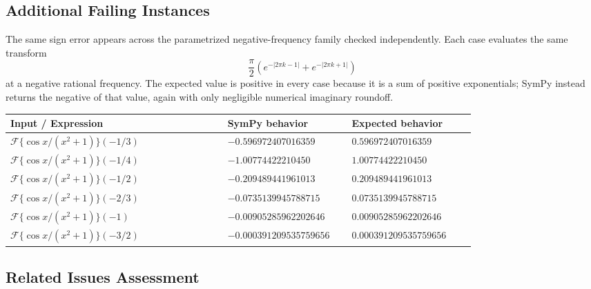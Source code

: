 \documentclass[11pt]{article}
\begin{document}
\subsection{Additional Failing Instances}

The same sign error appears across the parametrized negative-frequency family
checked independently. Each case evaluates the same transform
\[
    \frac{\pi}{2}\left(e^{-|2\pi k-1|}+e^{-|2\pi k+1|}\right)
\]
at a negative rational frequency. The expected value is positive in every case
because it is a sum of positive exponentials; SymPy instead returns the negative
of that value, again with only negligible numerical imaginary roundoff.

\begin{center}
\small
\renewcommand{\arraystretch}{1.3}
\begin{tabular}{@{}>{\raggedright\arraybackslash}p{0.42\linewidth}>{\raggedright\arraybackslash}p{0.24\linewidth}>{\raggedright\arraybackslash}p{0.24\linewidth}@{}}
\toprule
\textbf{Input / Expression} & \textbf{SymPy behavior} & \textbf{Expected behavior} \\
\midrule
\(\mathcal{F}\{\cos x/(x^2+1)\}(-1/3)\) & \(-0.596972407016359\) & \(0.596972407016359\) \\
\(\mathcal{F}\{\cos x/(x^2+1)\}(-1/4)\) & \(-1.00774422210450\) & \(1.00774422210450\) \\
\(\mathcal{F}\{\cos x/(x^2+1)\}(-1/2)\) & \(-0.209489441961013\) & \(0.209489441961013\) \\
\(\mathcal{F}\{\cos x/(x^2+1)\}(-2/3)\) & \(-0.0735139945788715\) & \(0.0735139945788715\) \\
\(\mathcal{F}\{\cos x/(x^2+1)\}(-1)\) & \(-0.00905285962202646\) & \(0.00905285962202646\) \\
\(\mathcal{F}\{\cos x/(x^2+1)\}(-3/2)\) & \(-0.000391209535759656\) & \(0.000391209535759656\) \\
\bottomrule
\end{tabular}
\end{center}

\subsection{Related Issues Assessment}
\end{document}

